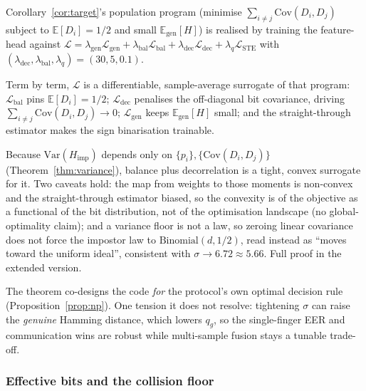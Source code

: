 Corollary~\ref{cor:target}'s population program (minimise $\sum_{i\neq j}\mathrm{Cov}(D_i,D_j)$ subject
to $\mathbb{E}[D_i]=1/2$ and small $\mathbb{E}_{\mathrm{gen}}[H]$) is realised by training the
feature-head against $\mathcal{L} = \lambda_{\mathrm{gen}}\mathcal{L}_{\mathrm{gen}} +
\lambda_{\mathrm{bal}}\mathcal{L}_{\mathrm{bal}} + \lambda_{\mathrm{dec}}\mathcal{L}_{\mathrm{dec}} +
\lambda_{q}\mathcal{L}_{\mathrm{STE}}$ with $(\lambda_{\mathrm{dec}},\lambda_{\mathrm{bal}},\lambda_q) =
(30,5,0.1)$.

\begin{theorem}
\label{thm:relaxation}
Term by term, $\mathcal{L}$ is a differentiable, sample-average surrogate of that program:
$\mathcal{L}_{\mathrm{bal}}$ pins $\mathbb{E}[D_i]=1/2$; $\mathcal{L}_{\mathrm{dec}}$ penalises the
off-diagonal bit covariance, driving $\sum_{i\neq j}\mathrm{Cov}(D_i,D_j)\to 0$;
$\mathcal{L}_{\mathrm{gen}}$ keeps $\mathbb{E}_{\mathrm{gen}}[H]$ small; and the straight-through
estimator makes the sign binarisation trainable.
\end{theorem}

Because $\mathrm{Var}(H_{\mathrm{imp}})$ depends only on $\{p_i\},\{\mathrm{Cov}(D_i,D_j)\}$
(Theorem~\ref{thm:variance}), balance plus decorrelation is a tight, convex surrogate for it. Two
caveats hold: the map from weights to those moments is non-convex and the straight-through estimator
biased, so the convexity is of the objective as a functional of the bit distribution, not of the
optimisation landscape (no global-optimality claim); and a variance floor is not a law, so zeroing
linear covariance does not force the impostor law to $\mathrm{Binomial}(d,1/2)$, read instead as
``moves toward the uniform ideal'', consistent with $\sigma \to 6.72 \approx 5.66$. Full proof in the
extended version.

The theorem co-designs the code \emph{for} the protocol's own optimal decision rule
(Proposition~\ref{prop:np}). One tension it does not resolve: tightening $\sigma$ can raise the
\emph{genuine} Hamming distance, which lowers $q_g$, so the single-finger EER and communication wins
are robust while multi-sample fusion stays a tunable trade-off.

\subsubsection{Effective bits and the collision floor}

